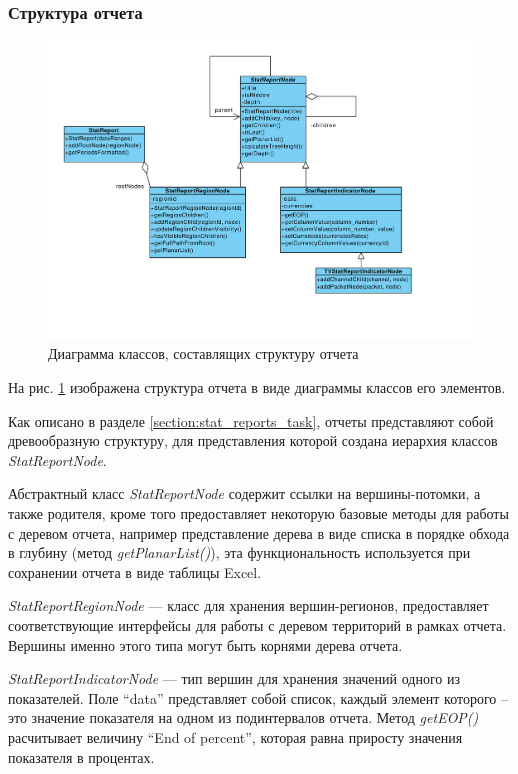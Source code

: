 \subsubsection{Структура отчета}
\begin{figure}[!ht]
\begin{center}
\vspace{-0.4cm}
\includegraphics[scale=0.65, trim=00mm 25mm 00mm 10mm, clip]{../resources/uml/StatReport.pdf}
\caption{Диаграмма классов, составлящих структуру отчета}
\label{gr:report_structure}
\end{center} 
\end{figure}
На рис. \ref{gr:report_structure} изображена структура отчета в виде диаграммы классов его элементов.

Как описано в разделе \ref{section:stat_reports_task}, отчеты представляют собой древообразную структуру,
для представления которой создана иерархия классов \textit{StatReportNode}.

Абстрактный класс \textit{StatReportNode} содержит ссылки на вершины-потомки, а также родителя,
кроме того предоставляет некоторую базовые методы для работы с деревом отчета,
например представление дерева в виде списка в порядке обхода в глубину (метод \textit{getPlanarList()}),
эта функциональность используется при сохранении отчета в виде таблицы Excel.

\textit{StatReportRegionNode} --- класс для хранения вершин-регионов, предоставляет соответствующие
интерфейсы для работы с деревом территорий в рамках отчета. Вершины именно этого типа могут быть корнями
дерева отчета.

\textit{StatReportIndicatorNode} --- тип вершин для хранения значений одного из показателей. 
Поле ``data'' представляет собой список, каждый элемент которого -- это значение показателя
на одном из подинтервалов отчета. Метод \textit{getEOP()} расчитывает величину 
``End of percent'', которая равна приросту значения показателя в процентах. 

